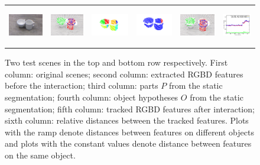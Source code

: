 \begin{figure}[ht!]
\begin{centering}
\begin{tabular}{p{}p{}p{}p{}p{}p{}}
    \includegraphics[height=1.65cm]{figures/scene2/image_before1.jpg}
&    \includegraphics[height=1.65cm]{figures/scene2/pcl_before1.png}
&    \includegraphics[height=1.65cm]{figures/scene2/segments1.png}    
&    \includegraphics[height=1.65cm]{figures/scene2/labels1.png}
&    \includegraphics[height=1.65cm]{figures/scene2/pcl_after1.png}  
&    \includegraphics[height=1.65cm]{figures/scene2/distances.png}

  \end{tabular}
		\vspace{-2ex}
    \caption{Two test scenes in the top and bottom row respectively. First column:
      original scenes; second column: extracted RGBD features before the
      interaction; third column: parts $P$ from the static segmentation;
      fourth column: object hypotheses $O$ from the static segmentation; fifth column:
      tracked RGBD features after interaction; sixth column: relative
      distances between the tracked features. Plots with the ramp denote distances between features on different objects 
      and plots with the constant values denote distance between features on the same object.}
    \label{fig:scenes}
  \end{centering}
\end{figure}


